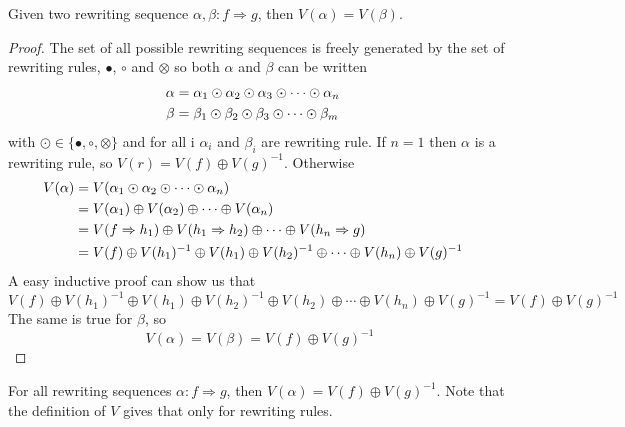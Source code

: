 \documentclass[a4paper]{article}
\begin{document}
\begin{proposition}
Given two rewriting sequence $\alpha, \beta: f \Rightarrow g$, then $V(\alpha) =
  V(\beta)$.

\begin{proof}
The set of all possible rewriting sequences is freely generated by the set of
rewriting rules, $\bullet$, $\circ$ and $\otimes$ so both $\alpha$ and $\beta$
  can be written
\begin{align}
\alpha &= \alpha_1 \odot \alpha_2 \odot \alpha_3 \odot \cdots \odot \alpha_n \cr
\beta &= \beta_1 \odot \beta_2 \odot \beta_3 \odot \cdots \odot \beta_m
\end{align}
with $\odot \in \{\bullet, \circ, \otimes\}$ and for all i $\alpha_i$ and
$\beta_i$ are rewriting rule.
If $n = 1$ then $\alpha$ is a rewriting rule, so $V(r) = V(f) \oplus V(g)^{-1}$.
Otherwise
\begin{align}
V(\alpha) &= V(\alpha_1 \odot \alpha_2 \odot \cdots \odot \alpha_n) \cr
&= V(\alpha_1) \oplus V(\alpha_2) \oplus \cdots \oplus V(\alpha_n) \cr
&= V(f \Rightarrow h_1) \oplus V(h_1 \Rightarrow h_2) \oplus \cdots \oplus
  V(h_n \Rightarrow g) \cr
&= V(f) \oplus V(h_1)^{-1} \oplus V(h_1) \oplus V(h_2)^{-1} \oplus \cdots
  \oplus V(h_n) \oplus V(g)^{-1}
\end{align}
A easy inductive proof can show us that
\[
V(f) \oplus V(h_1)^{-1} \oplus V(h_1) \oplus V(h_2)^{-1} \oplus V(h_2) \oplus
  \cdots \oplus V(h_n) \oplus V(g)^{-1} = V(f) \oplus V(g)^{-1}
\]
The same is true for $\beta$, so
\[
V(\alpha) = V(\beta) = V(f) \oplus V(g)^{-1}
\]
\end{proof}
\end{proposition}

\begin{corollary}
For all rewriting sequences $\alpha: f \Rightarrow g$, then $V(\alpha) = V(f)
  \oplus V(g)^{-1}$.
Note that the definition of $V$ gives that only for rewriting rules.
\end{corollary}
\end{document}
